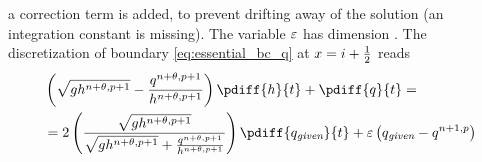 a correction term is added, to prevent drifting away of the solution (an integration constant is missing).
The variable $\varepsilon$ has dimension \bunit{\per\second}.
The discretization of  boundary \autoref{eq:essential_bc_q} at $x=i+\frac{1}{2}$ reads
\begin{align}
    &\left(\sqrt{gh^{n+\theta,p+1}} - \frac{q^{n+\theta,p+1}}{h^{n+\theta,p+1}} \right) \pdiff{h}{t} + \pdiff{q}{t} =
    \nonumber \\*
    & = 2 \left(  \frac{\sqrt{gh^{n+\theta,p+1}}}{\sqrt{gh^{n+\theta,p+1}} + \frac{q^{n+\theta,p+1}}{h^{n+\theta,p+1}}} \right) \pdiff{q_{\textit{given}}}{t} + \eps \left( q_{\textit{given}} - q^{n+1,p}   \right)
\end{align}


